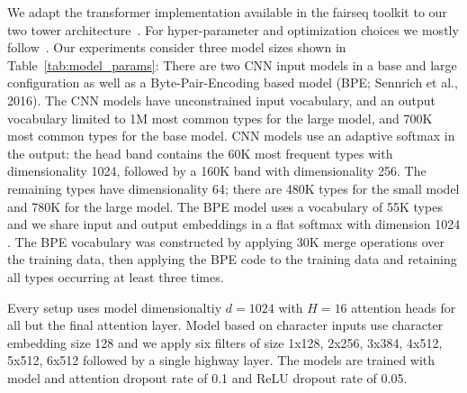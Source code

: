 \documentclass[11pt,a4paper]{article}
\begin{document}
We adapt the transformer implementation available in the fairseq toolkit to our two tower architecture~\citep{ott2019fairseq}.
For hyper-parameter and optimization choices we mostly follow~\citet{baevski2018adp}.
Our experiments consider three model sizes shown in Table~\ref{tab:model_params}: 
There are two CNN input models in a base and large configuration as well as a Byte-Pair-Encoding based model (BPE; Sennrich et al., 2016)\nocite{sennrich:bpe:2016}.
The CNN models have unconstrained input vocabulary, and an output vocabulary limited to 1M most common types for the large model, and 700K most common types for the base model.
CNN models use an adaptive softmax in the output: the head band contains the 60K most frequent types with dimensionality 1024, followed by a 160K band with dimensionality 256. 
The remaining types have dimensionality 64; there are 480K types for the small model and 780K for the large model. 
The BPE model uses a vocabulary of 55K types and we share input and output embeddings in a flat softmax with dimension 1024 \citep{inan2016tying,press2016using}.
The BPE vocabulary was constructed by applying 30K merge operations over the training data, then applying the BPE code to the training data and retaining all types occurring at least three times.

Every setup uses model dimensionaltiy $d=1024$ with $H=16$ attention heads for all but the final attention layer. 
Model based on character inputs use character embedding size 128 and we apply six filters of size 1x128, 2x256, 3x384, 4x512, 5x512, 6x512 followed by a single highway layer. 
The models are trained with model and attention dropout rate of 0.1 and ReLU dropout rate of 0.05.
\end{document}
